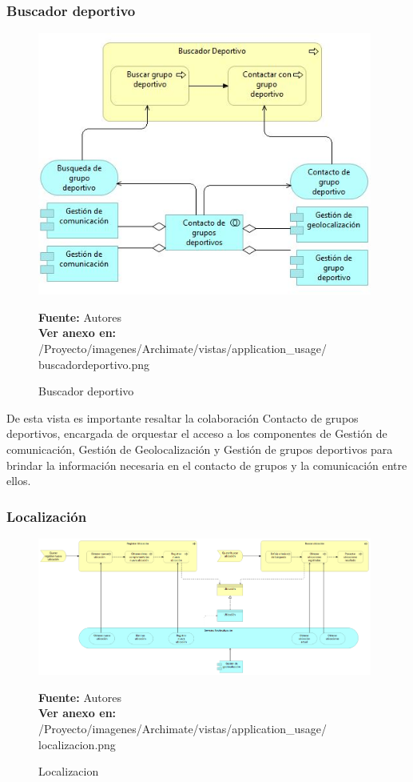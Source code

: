 \subsubsection{Buscador deportivo}

\begin{figure}[!htb]
  \begin{center}
    \includegraphics[width=11cm]{./imagenes/Archimate/vistas/application_usage/buscadordeportivo.png}
    \caption{Buscador deportivo}
    \label{fig:BP_BuscadorDeportivo}
    \textbf{Fuente:}  Autores \\
    \textbf{Ver anexo en:} /Proyecto/imagenes/Archimate/vistas/application\_usage/
    buscadordeportivo.png
  \end{center}
\end{figure}

De esta vista es importante resaltar la colaboración Contacto de grupos deportivos, encargada de orquestar el acceso a los componentes de Gestión de comunicación, Gestión de Geolocalización y Gestión de grupos deportivos para brindar la información necesaria en el contacto de grupos y la comunicación entre ellos.

\subsubsection{Localización}

\begin{figure}[!htb]
  \begin{center}
    \includegraphics[width=11cm]{./imagenes/Archimate/vistas/application_usage/localizacion.png}
    \caption{Localizacion}
    \label{fig:BP_localizacion}
    \textbf{Fuente:}  Autores \\
    \textbf{Ver anexo en:} /Proyecto/imagenes/Archimate/vistas/application\_usage/
    localizacion.png
  \end{center}
\end{figure}

